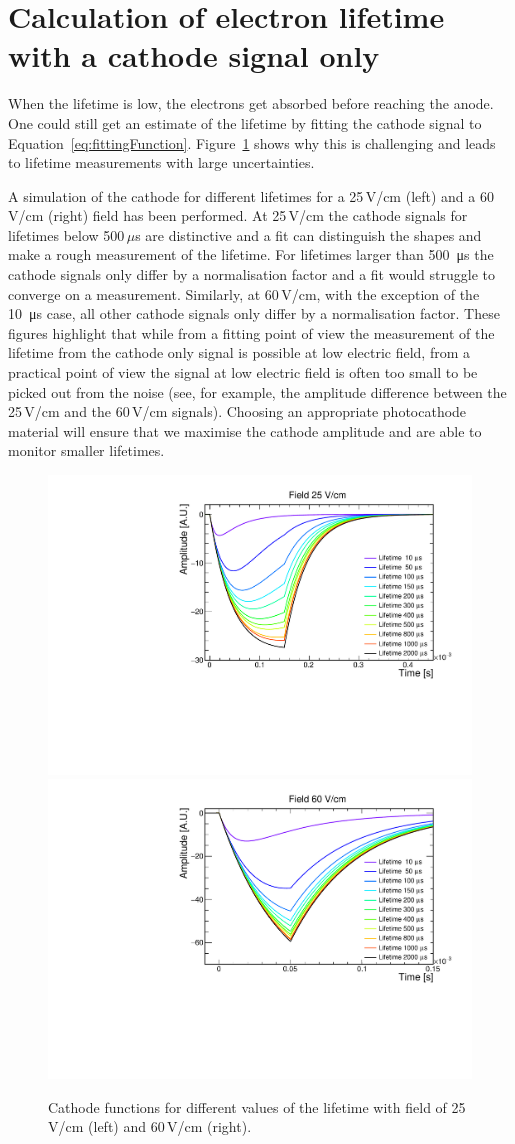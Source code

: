 \documentclass[a4paper,11pt]{article}
\begin{document}
\section{Calculation of electron lifetime with a cathode signal only}
When the lifetime is low, the electrons get absorbed before reaching the anode. One could still get an estimate of the lifetime by fitting the cathode signal to Equation~\ref{eq:fittingFunction}.
Figure~\ref{fig:cathodeFunctions} shows why this is challenging and leads to lifetime measurements with large uncertainties.

A simulation of the cathode for different lifetimes for a 25\,V/cm (left) and a 60\,V/cm (right) field has been performed.
At 25\,V/cm the cathode signals for lifetimes below 500\,$\mu$s are distinctive and a fit can distinguish the shapes and make a rough measurement of the lifetime. For lifetimes larger than \SI{500}{\micro\second} the cathode signals only differ by a normalisation factor and a fit would struggle to converge on a measurement. 
Similarly, at 60\,V/cm, with the exception of the \SI{10}{\micro\second} case, all other cathode signals only differ by a normalisation factor.
These figures highlight that while from a fitting point of view the measurement of the lifetime from the cathode only signal is possible at low electric field, from a practical point of view the signal at low electric field is often too small to be picked out from the noise (see, for example, the amplitude difference between the 25\,V/cm and the 60\,V/cm signals).
Choosing an appropriate photocathode material will ensure that we maximise the cathode amplitude and are able to monitor smaller lifetimes.


\begin{figure}
    \centering
    \includegraphics[width=.49\linewidth]{figures/CathodeFunctions_field25.pdf}
    \includegraphics[width=.49\linewidth]{figures/CathodeFunctions_field60.pdf}
    \caption{Cathode functions for different values of the lifetime with field of 25\,V/cm (left) and 60\,V/cm (right).}
    \label{fig:cathodeFunctions}
\end{figure}
\end{document}
